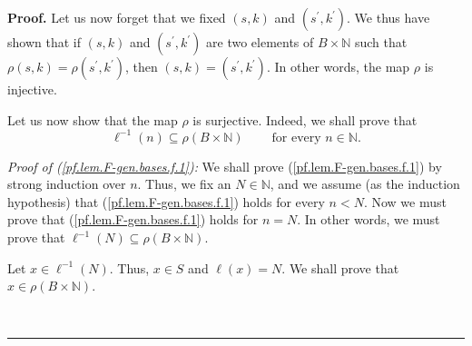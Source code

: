\documentclass[numbers=enddot,12pt,final,onecolumn,notitlepage]{scrartcl}%
\theoremstyle{definition}
\newenvironment{proof}[1][Proof]{\noindent\textbf{#1.} }{\ \rule{0.5em}{0.5em}}
\begin{document}
\begin{proof}
Let us now forget that we fixed $\left(  s,k\right)  $ and $\left(  s^{\prime
},k^{\prime}\right)  $. We thus have shown that if $\left(  s,k\right)  $ and
$\left(  s^{\prime},k^{\prime}\right)  $ are two elements of $B\times
\mathbb{N}$ such that $\rho\left(  s,k\right)  =\rho\left(  s^{\prime
},k^{\prime}\right)  $, then $\left(  s,k\right)  =\left(  s^{\prime
},k^{\prime}\right)  $. In other words, the map $\rho$ is injective.

Let us now show that the map $\rho$ is surjective. Indeed, we shall prove that%
\begin{equation}
\ell^{-1}\left(  n\right)  \subseteq\rho\left(  B\times\mathbb{N}\right)
\ \ \ \ \ \ \ \ \ \ \text{for every }n\in\mathbb{N}.
\label{pf.lem.F-gen.bases.f.1}%
\end{equation}


\textit{Proof of (\ref{pf.lem.F-gen.bases.f.1}):} We shall prove
(\ref{pf.lem.F-gen.bases.f.1}) by strong induction over $n$. Thus, we fix an
$N\in\mathbb{N}$, and we assume (as the induction hypothesis) that
(\ref{pf.lem.F-gen.bases.f.1}) holds for every $n<N$. Now we must prove that
(\ref{pf.lem.F-gen.bases.f.1}) holds for $n=N$. In other words, we must prove
that $\ell^{-1}\left(  N\right)  \subseteq\rho\left(  B\times\mathbb{N}%
\right)  $.

Let $x\in\ell^{-1}\left(  N\right)  $. Thus, $x\in S$ and $\ell\left(
x\right)  =N$. We shall prove that $x\in\rho\left(  B\times\mathbb{N}\right)
$.


\end{proof}
\end{document}
